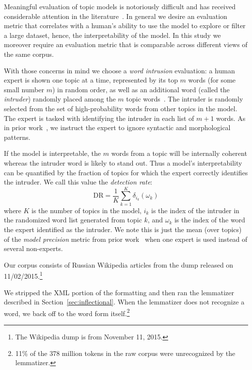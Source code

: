 \documentclass{clv2}
\newcommand{\dirac}[2]{\delta_{#1}\left(#2\right)}
\newcommand{\DR}{\ensuremath{\textrm{DR}}}
\begin{document}
{Meaningful evaluation of topic models is notoriously
difficult and has received considerable attention in the
literature~\cite{chang2009,wallach2009a,newman2010,mimno2011}.
In general we desire an evaluation metric that correlates with a
human's ability to use the model to explore or filter a large dataset,
hence, the interpretability of the model.  In this study we moreover
require an evaluation metric that is comparable across different views
of the same corpus.

With those concerns in mind we choose a \emph{word intrusion}
evaluation:
a human expert is shown one topic at a time, represented
by its top $m$ words (for some small number $m$) in random order, as
well as an additional word (called the \emph{intruder}) randomly placed
among the $m$ topic words~\cite{chang2009}.
The intruder is randomly selected from the set of high-probability
words from other topics in the model.
The expert is tasked with identifying the intruder in each list of
$m + 1$ words.
As in prior work~\cite{chang2009}, we instruct the expert to ignore
syntactic and morphological patterns.

If the model is interpretable, the $m$ words from a topic will be
internally coherent whereas the intruder word is likely to stand out.
Thus a model's interpretability can be quantified by the fraction
of topics for which the expert correctly identifies the intruder.  We
call this value the \emph{detection rate}:
\begin{equation*}
    \DR = \frac{1}{K} \sum_{k=1}^K \dirac{i_k}{\omega_k}
\end{equation*}
where $K$ is the number of topics in the model, $i_k$ is the index
of the intruder in the randomized word list generated from topic $k$,
and $\omega_k$ is the index of the word the expert identified as the
intruder.  We note this is just the mean (over topics) of the
\emph{model precision} metric from prior work~\cite{chang2009}
when one expert is used instead of several non-experts.

Our corpus consists of Russian Wikipedia articles from the dump
released on 11/02/2015.\footnote{The Wikipedia dump is from November 11, 2015.}

}
We stripped the XML portion of the formatting and then ran the
lemmatizer described in Section~\ref{sec:inflectional}.  When the
lemmatizer does not recognize a word, we back off to the word form
itself.\footnote{
    11\% of the 378 million tokens in the raw corpus were
    unrecognized by the lemmatizer.
}
\end{document}

